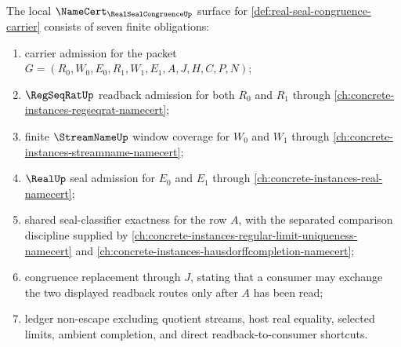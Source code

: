 \begin{theorem}
\label{thm:real-seal-congruence-namecert-obligations}
The local $\NameCert_{\RealSealCongruenceUp}$ surface for \autoref{def:real-seal-congruence-carrier} consists of seven finite obligations:
\begin{enumerate}
\item carrier admission for the packet $G=(R_0,W_0,E_0,R_1,W_1,E_1,A,J,H,C,P,N)$;
\item $\RegSeqRatUp$ readback admission for both $R_0$ and $R_1$ through \autoref{ch:concrete-instances-regseqrat-namecert};
\item finite $\StreamNameUp$ window coverage for $W_0$ and $W_1$ through \autoref{ch:concrete-instances-streamname-namecert};
\item $\RealUp$ seal admission for $E_0$ and $E_1$ through \autoref{ch:concrete-instances-real-namecert};
\item shared seal-classifier exactness for the row $A$, with the separated comparison discipline supplied by \autoref{ch:concrete-instances-regular-limit-uniqueness-namecert} and \autoref{ch:concrete-instances-hausdorffcompletion-namecert};
\item congruence replacement through $J$, stating that a consumer may exchange the two displayed readback routes only after $A$ has been read;
\item ledger non-escape excluding quotient streams, host real equality, selected limits, ambient completion, and direct readback-to-consumer shortcuts.
\end{enumerate}
\end{theorem}
